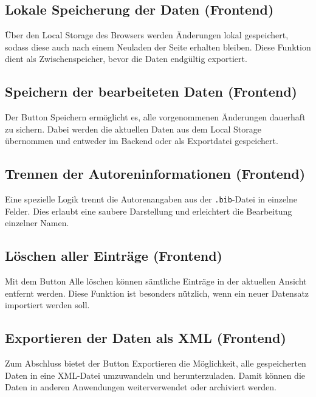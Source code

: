 \subsection{Lokale Speicherung der Daten (Frontend)}
Über den Local Storage des Browsers werden Änderungen lokal gespeichert, sodass diese auch nach 
einem Neuladen der Seite erhalten bleiben. Diese Funktion dient als Zwischenspeicher, 
bevor die Daten endgültig exportiert.

\subsection{Speichern der bearbeiteten Daten (Frontend)}
Der Button \glqq Speichern\grqq{} ermöglicht es, alle vorgenommenen Änderungen dauerhaft zu sichern.
Dabei werden die aktuellen Daten aus dem Local Storage übernommen und entweder im Backend oder als Exportdatei gespeichert.

\subsection{Trennen der Autoreninformationen (Frontend)}
Eine spezielle Logik trennt die Autorenangaben aus der \texttt{.bib}-Datei in einzelne Felder.
Dies erlaubt eine saubere Darstellung und erleichtert die Bearbeitung einzelner Namen.

\subsection{Löschen aller Einträge (Frontend)}
Mit dem Button \glqq Alle löschen\grqq{} können sämtliche Einträge in der aktuellen Ansicht entfernt werden.
Diese Funktion ist besonders nützlich, wenn ein neuer Datensatz importiert werden soll.

\subsection{Exportieren der Daten als XML (Frontend)}
Zum Abschluss bietet der Button \glqq Exportieren\grqq{} die Möglichkeit, 
alle gespeicherten Daten in eine XML-Datei umzuwandeln und herunterzuladen.
Damit können die Daten in anderen Anwendungen weiterverwendet oder archiviert werden.
